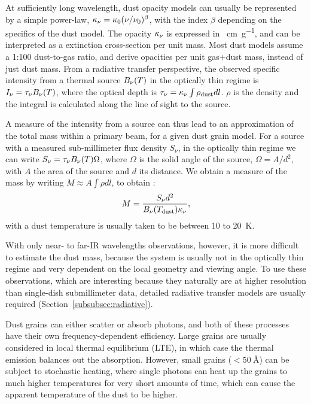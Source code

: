 At sufficiently long wavelength, dust opacity models can usually be represented by a simple power-law, $\kappa_\nu = \kappa_0(\nu/\nu_0)^\beta$, with the index $\beta$ depending on the specifics of the dust model. The opacity $\kappa_\nu$ is expressed in \si{\centi\meter\per\gram}, and can be interpreted as a extinction cross-section per unit mass. Most dust models assume a 1:100 dust-to-gas ratio, and derive opacities per unit {gas+dust} mass, instead of just dust mass. From a radiative transfer perspective, the observed specific intensity from a thermal source $B_\nu(T)$ in the optically thin regime is $I_\nu = \tau_\nu B_\nu(T)$, where the optical depth is $\tau_\nu = \Knu\int{\rho_\dust dl}$. $\rho$ is the density and the integral is calculated along the line of sight to the source. %

A measure of the intensity from a source can thus lead to an approximation of the total mass within a primary beam, for a given dust grain model. For a source with a measured sub-millimeter flux density $S_\nu$, in the optically thin regime we can write $S_\nu=\tau_\nu B_\nu(T)\Omega$, where $\Omega$ is the solid angle of the source, $\Omega = A/d^2$, with $A$ the area of the source and $d$ its distance. We obtain a measure of the mass by writing $M\approx A\int{\rho dl}$, to obtain \citep{Shirley:2000gh}:
\begin{equation}
M = \frac{S_\nu d^2}{B_\nu(T_\textrm{dust})\kappa_\nu},
\end{equation}
with a dust temperature is usually taken to be between 10 to \SI{20}{\kelvin}. 

With only near- to far-IR wavelengths observations, however, it is more difficult to estimate the dust mass, because the system is usually not in the optically thin regime and very dependent on the local geometry and viewing angle. To use these observations, which are interesting because they naturally are at higher resolution than single-dish submillimeter data, detailed radiative transfer models are usually required (Section~\ref{subsubsec:radiative}).


Dust grains can either scatter or absorb photons, and both of these processes have their own frequency-dependent efficiency. Large grains are usually considered in local thermal equilibrium (LTE), in which case the thermal emission balances out the absorption. However, small grains ($<\SI{50}{\angstrom}$) can be subject to stochastic heating, where single photons can heat up the grains to much higher temperatures for very short amounts of time, which can cause the apparent temperature of the dust to be higher.

